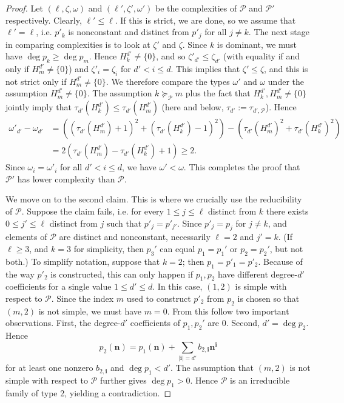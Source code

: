 \documentclass[11pt]{amsart}
\theoremstyle{definition}
\newcommand{\CP}{{\mathcal P}}
\newcommand{\bn}{{\mathbf{n}}}
\newcommand{\1}{{\mathbf{1}}}
\newcommand{\bi}{{\textbf{i}}}
\newcommand{\brac}[1]{\mathopen{}\left( #1 \mathclose{}\right)}
\begin{document}
\begin{proof}
    Let $(\ell, \zeta, \omega)$ and $(\ell', \zeta', \omega')$ be the complexities of $\CP$ and $\CP'$ respectively. Clearly, $\ell'\leq \ell$. If this is strict, we are done, so we assume that $\ell'=\ell$, i.e. $p'_k$ is nonconstant and distinct from $p'_j$ for all $j\neq k$. The next stage in comparing complexities is to look at $\zeta'$ and $\zeta$. Since $k$ is dominant, we must have $\deg p_k\geq \deg p_m$. Hence $H_{k}^{d'}\neq \{0\}$, and so $\zeta'_{d'} \leq \zeta_{d'}$ (with equality if and only if $H_{m}^{d'}\neq \{0\}$) and $\zeta'_i = \zeta_i$ for $d'<i\leq d$. This implies that $\zeta'\leq \zeta$, and this is not strict only if $H_{m}^{d'}\neq\{0\}$. We therefore compare the types $\omega'$ and $\omega$ under the assumption $H_{m}^{d'}\neq \{0\}$. The assumption $k\succeq_\CP m$ plus the fact that $H_{k}^{d'},H_{m}^{d'}\neq \{0\}$ jointly imply that $\tau_{d'}(H_{k}^{d'})\leq \tau_{d'}(H_{m}^{d'})$ (here and below, $\tau_{d'}:=\tau_{d',\CP}$). Hence 
\begin{align*}
    \omega'_{d'}-\omega_{d'} %
    &= \brac{(\tau_{d'}(H_{m}^{d'})+1)^2 + (\tau_{d'}(H_{k}^{d'})-1)^2}-\brac{\tau_{d'}(H_{m}^{d'})^2 + \tau_{d'}(H_{k}^{d'})^2}\\
    &= 2(\tau_{d'}(H_{m}^{d'})- \tau_{d'}(H_{k}^{d'})+1)\geq 2.
\end{align*}
    Since $\omega_i = \omega'_i$ for all $d'<i\leq d$, we have $\omega'<\omega$. This completes the proof that $\CP'$ has lower complexity than $\CP$.

We move on to the second claim. This is where we crucially use the reducibility of $\CP$. Suppose the claim fails, i.e. for every $1\leq j\leq \ell$ distinct from $k$ there exists $0\leq j'\leq \ell$ distinct from $j$ such that $p'_j = p'_{j'}$. 
Since $p'_j = p_j$ for $j\neq k$, and elements of $\CP$ are distinct and nonconstant, necessarily $\ell =2$ and $j'=k$. (If $\ell \geq 3$, and $k=3$ for simplicity, then $p_3'$ can equal $p_1=p_1'$ or $p_2=p_2'$, but not both.) To simplify notation, suppose that $k = 2$; then $p_1 = p'_1 = p'_2$. Because of the way $p'_2$ is constructed, this can only happen if $p_1, p_2$  have different degree-$d'$ coefficients for a single value $1\leq d'\leq d$. In this case, {$(1,2)$ is simple with respect to $\CP$}. Since the index $m$ used to construct $p'_2$ from $p_2$ is chosen so that $(m,2)$ is not simple, we must have $m=0$. From this follow two important observations. First, the degree-$d'$ coefficients of $p_1, p_2'$ are 0. Second, $d' = \deg p_2$. Hence $$p_2(\bn) = p_1(\bn) + \sum_{\vert\bi\vert=d'}b_{2,\bi}\bn^{\bi}$$ for at least one nonzero $b_{2,\bi}$ and $\deg p_1 < d'$. The assumption that $(m,2)$ is not simple with respect to $\CP$ further gives $\deg p_1 > 0$. Hence $\CP$ is an irreducible family of type 2, yielding a contradiction.
\end{proof}
\end{document}
